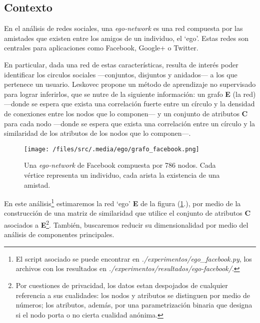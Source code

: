 
\vspace{2em}
\subsection{Contexto} 

En el análisis de redes sociales, una \textit{ego-network} \cite{Leskovec} es una red compuesta por las amistades que existen entre los amigos de un individuo, el `ego'. Estas redes son centrales para aplicaciones como Facebook, Google+ o Twitter. 

\vspace{1em}
En particular, dada una red de estas características, resulta de interés poder identificar los circulos sociales ---conjuntos, disjuntos y anidados--- a los que pertenece un usuario. Leskovec \cite{Leskovec} propone un método de aprendizaje no supervisado para lograr inferirlos, que se nutre de la siguiente información: un grafo \textbf{E} (la red) ---donde se espera que exista una correlación fuerte entre un círculo y la densidad de conexiones entre los nodos que lo componen--- y un conjunto de atributos \textbf{C} para cada nodo ---donde se espera que exista una correlación entre un círculo y la similaridad de los atributos de los nodos que lo componen---.

\vspace{1em}
\begin{figure}[!htbp]
\texttt{[image: /files/src/.media/ego/grafo\_facebook.png]}
\caption{Una \textit{ego-network} de Facebook compuesta por 786 nodos. Cada vértice representa un individuo, cada arista la existencia de una amistad.} \label{ego_facebook}
\end{figure}

\vspace{1em}
En este análisis\footnote{El script asociado se puede encontrar en \textit{./experimentos/ego\_facebook.py}, los archivos con los resultados  en \textit{./experimentos/resultados/ego-facebook/}.} estimaremos la red `ego' \textbf{E} de la figura (\ref{ego_facebook}.), por medio de la construcción de una matriz de similaridad que utilice el conjunto de atributos \textbf{C} asociados a \textbf{E}\footnote{Por cuestiones de privacidad, los datos estan despojados de cualquier referencia a sus cualidades: los nodos y atributos se distinguen por medio de números; los atributos, además, por una parametrización binaria que designa si el nodo porta o no cierta cualidad anónima.}. También, buscaremos reducir su dimensionalidad por medio del análisis de componentes principales.




